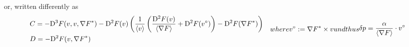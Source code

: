 or, written differently as
\begin{subequations}
    \begin{align}
        &\begin{aligned}
            C   &=
            - \diff{3}{F}( v, v, \darg{F} )  -
            \diff{2}{F}( v )
            \left( \frac{ 1 }{ \skaq{v} }
            \left( \frac{ \diff{2}{F}( v ) }{ \skaq{\grad{F}} }  +
            \diff{2}{F}( v^\circ ) \right)  -
            \diff{2}{F}( \darg{F} ) \right)
        \end{aligned}\\
        &D   =   - \diff{2}{F}( v, \darg{F} )
    \end{align}
    where
    \begin{align}
        v^\circ   :=
        \darg{F} \times v
    \end{align}
    und thus
    \begin{align}
        \delta p   =
        \frac{ \alpha }{ \skaq{\grad{F}} } \mult v^\circ
    \end{align}
\end{subequations}